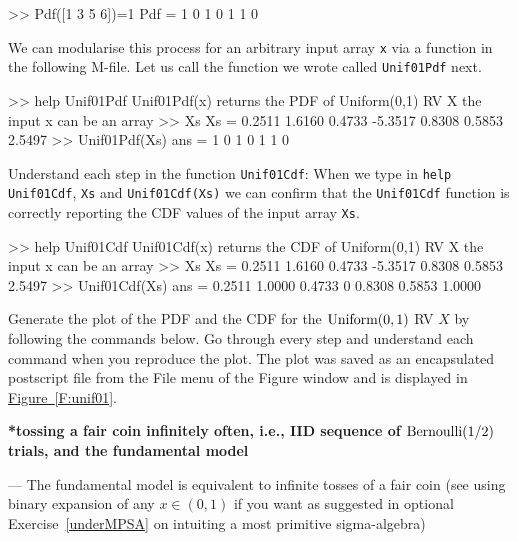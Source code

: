 {\begin{labwork}
\begin{VrbM}
>> Pdf([1     3     5     6])=1
Pdf =     1     0     1     0     1     1     0
\end{VrbM}
We can modularise this process for an arbitrary input array {\tt x} via a function in the following M-file.
Let us call the function we wrote called {\tt Unif01Pdf} next.
\begin{VrbM}
>> help Unif01Pdf
  Unif01Pdf(x) returns the PDF of Uniform(0,1) RV X
  the input x can be an array
>> Xs
Xs =    0.2511    1.6160    0.4733   -5.3517    0.8308    0.5853    2.5497
>> Unif01Pdf(Xs)
ans =     1     0     1     0     1     1     0
\end{VrbM}
\end{labwork}

\begin{labwork}\label{LW:Unif01Cdf}
Understand each step in the function {\tt Unif01Cdf}:
When we type in {\tt help Unif01Cdf}, {\tt Xs} and {\tt Unif01Cdf(Xs)} we can confirm that the {\tt Unif01Cdf} function is correctly reporting the CDF values of the input array {\tt Xs}.
\begin{VrbM}
>> help Unif01Cdf
  Unif01Cdf(x) returns the CDF of Uniform(0,1) RV X
  the input x can be an array 
>> Xs
Xs =    0.2511    1.6160    0.4733   -5.3517    0.8308    0.5853    2.5497
>> Unif01Cdf(Xs)
ans =    0.2511    1.0000    0.4733         0    0.8308    0.5853    1.0000
\end{VrbM}
\end{labwork}

\begin{labwork}\label{LW:PlotUnif01PdfCdf}
Generate the plot of the PDF and the CDF for the $\mbox{{\rm Uniform}}(0,1)$ RV $X$ by following the commands below.  Go through every step and understand each command when you reproduce the plot.
The plot was saved as an encapsulated postscript file from the File menu of the Figure window and is displayed in \hyperref[F:unif01]{Figure~\ref*{F:unif01}}.
 \end{labwork}
}

{\bf **tossing a fair coin infinitely often, i.e., IID sequence of $\mbox{{\rm Bernoulli}}(1/2)$ trials, and the fundamental model}


--- The fundamental model is equivalent to infinite tosses of a fair coin (see using binary expansion of any $x \in (0,1)$ if you want as suggested in optional Exercise~\ref{underMPSA} on intuiting a most primitive sigma-algebra)

